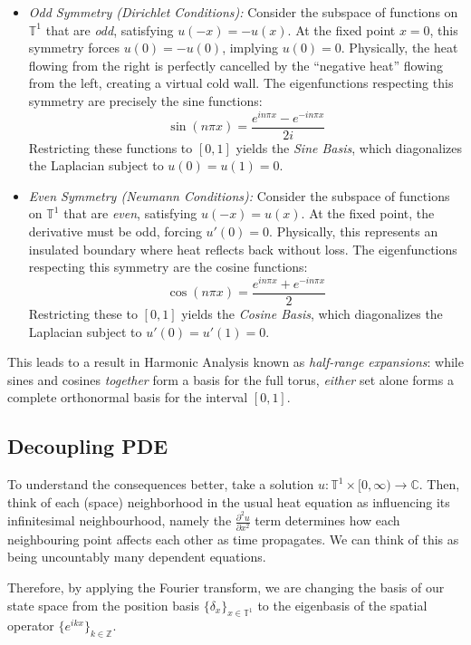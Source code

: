 \documentclass{article}
\newcommand{\C}{{\mathbb{C}}}
\newcommand{\T}{{\mathbb{T}}}
\newcommand{\Z}{{\mathbb{Z}}}
\begin{document}
\begin{itemize}
    \item \emph{Odd Symmetry (Dirichlet Conditions):}
    Consider the subspace of functions on $\T^1$ that are \emph{odd}, satisfying $u(-x) = -u(x)$. At the
    fixed point $x=0$, this symmetry forces $u(0) = -u(0)$, implying $u(0) = 0$. Physically, the heat
    flowing from the right is perfectly cancelled by the ``negative heat'' flowing from the left, creating a
    virtual cold wall. The eigenfunctions respecting this symmetry are precisely the sine functions:
    \[ \sin(n\pi x) = \frac{e^{in\pi x} - e^{-in\pi x}}{2i} \]
    Restricting these functions to $[0,1]$ yields the \emph{Sine Basis}, which diagonalizes the Laplacian
    subject to $u(0)=u(1)=0$.

    \item \emph{Even Symmetry (Neumann Conditions):}
    Consider the subspace of functions on $\T^1$ that are \emph{even}, satisfying $u(-x) = u(x)$. At the
    fixed point, the derivative must be odd, forcing $u'(0) = 0$. Physically, this represents an insulated
    boundary where heat reflects back without loss. The eigenfunctions respecting this symmetry are the cosine
    functions:
    \[ \cos(n\pi x) = \frac{e^{in\pi x} + e^{-in\pi x}}{2} \]
    Restricting these to $[0,1]$ yields the \emph{Cosine Basis}, which diagonalizes the Laplacian subject
    to $u'(0)=u'(1)=0$.
\end{itemize}

This leads to a result in Harmonic Analysis known as \emph{half-range expansions}: while sines and
cosines \emph{together} form a basis for the full torus, \emph{either} set alone forms a complete orthonormal
basis for the interval $[0,1]$.





\subsection*{Decoupling PDE}

To understand the consequences better, take a solution $u: \T^1\times [0, \infty) \to \C$. Then, think of
each (space) neighborhood in the usual heat equation as influencing its infinitesimal neighbourhood, namely
the $\frac{\partial^2 u}{\partial x^2}$ term determines how each neighbouring point affects each other as
time propagates. We can think of this as being uncountably many dependent equations.

Therefore, by applying the Fourier transform, we are changing the basis of our state space
from the position basis $\{ \delta_x \}_{x \in \T^1}$ to the eigenbasis of the spatial
operator $\{ e^{ikx} \}_{k \in \Z}$.
\end{document}

